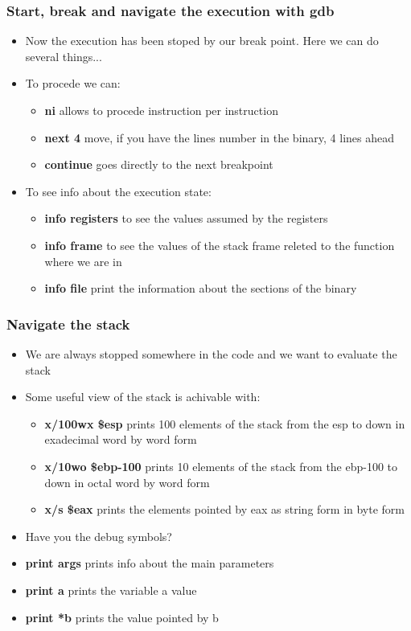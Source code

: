 \documentclass[]{beamer}
\begin{document}
      \begin{frame}
        \frametitle{Start, break and navigate the execution with gdb}
        \begin{itemize}
            \item{Now the execution has been stoped by our break point. Here we can do several things...}
            \item{To procede we can:}
            \begin{itemize}
                \item{{\bf ni} allows to procede instruction per instruction}
                \item{{\bf next 4} move, if you have the lines number in the binary, 4 lines ahead}
                \item{{\bf continue} goes directly to the next breakpoint}
            \end{itemize}
            \item{To see info about the execution state:}
            \begin{itemize}
                \item{{\bf info registers} to see the values assumed by the registers}
                \item{{\bf info frame} to see the values of the stack frame releted to the function where we are in}
                \item{{\bf info file} print the information about the sections of the binary}
            \end{itemize}
        \end{itemize}
      \end{frame}
      \begin{frame}
        \frametitle{Navigate the stack}
        \begin{itemize}
            \item{We are always stopped somewhere in the code and we want to evaluate the stack}
            \item{Some useful view of the stack is achivable with:}
            \begin{itemize}
               \item{{\bf x/100wx \$esp} prints 100 elements of the stack from the esp to down in exadecimal word by word form}
               \item{{\bf x/10wo \$ebp-100} prints 10 elements of the stack from the ebp-100 to down in octal word by word form}
               \item{{\bf x/s \$eax} prints the elements pointed by eax as string form in byte form }
            \end{itemize}
            \item{Have you the debug symbols?}
                \item{{\bf print args} prints info about the main parameters}
                \item{{\bf print a} prints the variable a value}
                \item{{\bf print *b} prints the value pointed by b}
        \end{itemize}
      \end{frame}
\end{document}
